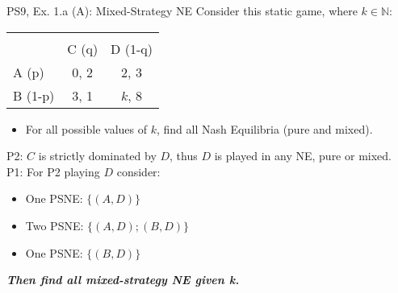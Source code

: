 \begin{frame}{PS9, Ex. 1.a (A): Mixed-Strategy NE}
      Consider this static game, where $k\in\mathbb{N}:$
      \vspace{-16pt}
      \begin{table}
        \begin{tabular}{l|c|c|}
          \multicolumn{1}{c}{} & \multicolumn{2}{c}{} \\
          \multicolumn{1}{c}{} & \multicolumn{1}{c}{C (q)} & \multicolumn{1}{c}{\color{blue}D (1-q)} \\\cline{2-3}
          A (p)   & 0, 2 & 2, \color{blue}3 \\\cline{2-3}
          B (1-p) & 3, 1 & $k$, \color{blue}8 \\\cline{2-3}
        \end{tabular}
      \end{table}
      \begin{itemize}
        \item[(a)] For all possible values of $k$, find all Nash Equilibria (pure and mixed).
      \end{itemize}
      P2: $C$ is strictly dominated by $D$, thus $D$ is played in any NE, pure or mixed.\\\medskip
      P1: For P2 playing $D$ consider:
      \begin{itemize}
        \item[$k=$1:] One PSNE: $\{(A,D)\}$
        \item[$k=$2:] Two PSNE: $\{(A,D);(B,D)\}$
        \item[$k\geq$3:] One PSNE: $\{(B,D)\}$
      \end{itemize}
      \textbf{\textit{Then find all mixed-strategy NE given k.}}
      \vfill\null
\end{frame}

